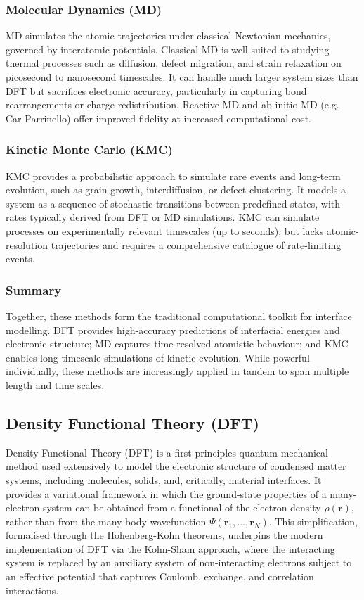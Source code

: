 \subsubsection{Molecular Dynamics (MD)} 
 
MD simulates the atomic trajectories under classical Newtonian mechanics, governed by interatomic potentials. Classical MD is well-suited to studying thermal processes such as diffusion, defect migration, and strain relaxation on picosecond to nanosecond timescales. It can handle much larger system sizes than DFT but sacrifices electronic accuracy, particularly in capturing bond rearrangements or charge redistribution. Reactive MD and ab initio MD (e.g. Car-Parrinello) offer improved fidelity at increased computational cost. 
 
\subsubsection{Kinetic Monte Carlo (KMC)} 
 
KMC provides a probabilistic approach to simulate rare events and long-term evolution, such as grain growth, interdiffusion, or defect clustering. It models a system as a sequence of stochastic transitions between predefined states, with rates typically derived from DFT or MD simulations. KMC can simulate processes on experimentally relevant timescales (up to seconds), but lacks atomic-resolution trajectories and requires a comprehensive catalogue of rate-limiting events. 
 
\subsubsection{Summary} 
 
Together, these methods form the traditional computational toolkit for interface modelling. DFT provides high-accuracy predictions of interfacial energies and electronic structure; MD captures time-resolved atomistic behaviour; and KMC enables long-timescale simulations of kinetic evolution. While powerful individually, these methods are increasingly applied in tandem to span multiple length and time scales. 
 
\subsection{Density Functional Theory (DFT)} 
 
Density Functional Theory (DFT) is a first-principles quantum mechanical method used extensively to model the electronic structure of condensed matter systems, including molecules, solids, and, critically, material interfaces. It provides a variational framework in which the ground-state properties of a many-electron system can be obtained from a functional of the electron density $\rho(\mathbf{r})$, rather than from the many-body wavefunction $\Psi(\mathbf{r}_1, \dots, \mathbf{r}_N)$. This simplification, formalised through the Hohenberg-Kohn theorems, underpins the modern implementation of DFT via the Kohn-Sham approach, where the interacting system is replaced by an auxiliary system of non-interacting electrons subject to an effective potential that captures Coulomb, exchange, and correlation interactions. 
 
